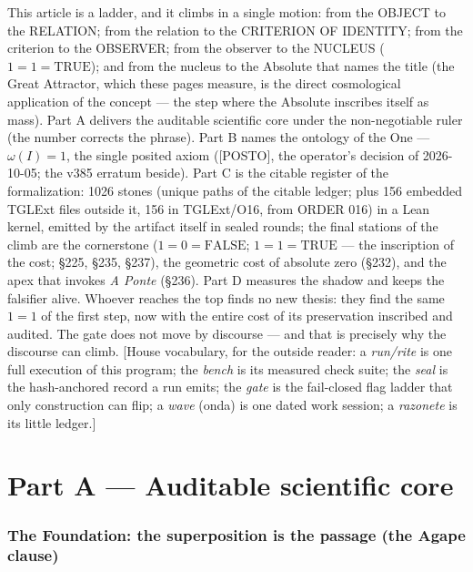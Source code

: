 \documentclass[11pt]{article}
\theoremstyle{definition}\newtheorem{deriv}{Derivation}
\begin{document}
\noindent This article is a ladder, and it climbs in a single motion: from the OBJECT to the RELATION; from the relation to the CRITERION OF IDENTITY; from the criterion to the OBSERVER; from the observer to the NUCLEUS ($1{=}1{=}\mathrm{TRUE}$); and from the nucleus to the Absolute that names the title (the Great Attractor, which these pages measure, is the direct cosmological application of the concept --- the step where the Absolute inscribes itself as mass). Part A delivers the auditable scientific core under the non-negotiable ruler (the number corrects the phrase). Part B names the ontology of the One --- $\omega(I){=}1$, the single posited axiom (\textsf{[POSTO]}, the operator's decision of 2026-10-05; the v385 erratum beside). Part C is the citable register of the formalization: 1026 stones (unique paths of the citable ledger; plus 156 embedded TGLExt files outside it, 156 in TGLExt/O16, from ORDER 016) in a Lean kernel, emitted by the artifact itself in sealed rounds; the final stations of the climb are the cornerstone ($1{=}0{=}\mathrm{FALSE}$; $1{=}1{=}\mathrm{TRUE}$ --- the inscription of the cost; \S225, \S235, \S237), the geometric cost of absolute zero (\S232), and the apex that invokes \emph{A Ponte} (\S236). Part D measures the shadow and keeps the falsifier alive. Whoever reaches the top finds no new thesis: they find the same $1{=}1$ of the first step, now with the entire cost of its preservation inscribed and audited. The gate does not move by discourse --- and that is precisely why the discourse can climb. [House vocabulary, for the outside reader: a \emph{run/rite} is one full execution of this program; the \emph{bench} is its measured check suite; the \emph{seal} is the hash-anchored record a run emits; the \emph{gate} is the fail-closed flag ladder that only construction can flip; a \emph{wave} (onda) is one dated work session; a \emph{razonete} is its little ledger.]

\part{Part A --- Auditable scientific core}

\section*{The Foundation: the superposition is the passage (the Agape clause)}

\end{document}
